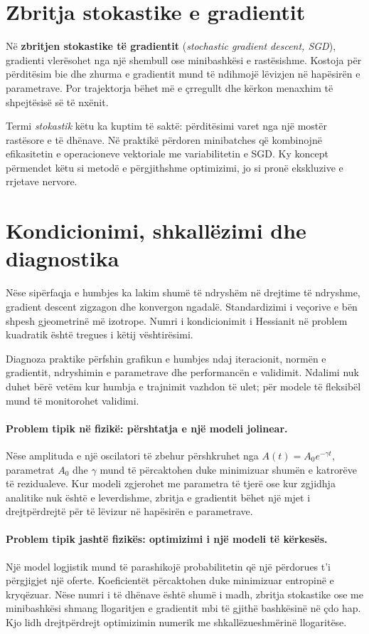 \documentclass[12pt,a4paper,oneside]{book}
\newcommand{\term}[2]{\textbf{#1} (\textit{#2})}
\begin{document}
\section{Zbritja stokastike e gradientit}

Në \term{zbritjen stokastike të gradientit}{stochastic gradient descent, SGD}, gradienti vlerësohet nga një shembull ose minibashkësi e rastësishme. Kostoja për përditësim bie dhe zhurma e gradientit mund të ndihmojë lëvizjen në hapësirën e parametrave. Por trajektorja bëhet më e çrregullt dhe kërkon menaxhim të shpejtësisë së të nxënit.

Termi \emph{stokastik} këtu ka kuptim të saktë: përditësimi varet nga një mostër rastësore e të dhënave. Në praktikë përdoren minibatches që kombinojnë efikasitetin e operacioneve vektoriale me variabilitetin e SGD. Ky koncept përmendet këtu si metodë e përgjithshme optimizimi, jo si pronë ekskluzive e rrjetave nervore.

\section{Kondicionimi, shkallëzimi dhe diagnostika}

Nëse sipërfaqja e humbjes ka lakim shumë të ndryshëm në drejtime të ndryshme, gradient descent zigzagon dhe konvergon ngadalë. Standardizimi i veçorive e bën shpesh gjeometrinë më izotrope. Numri i kondicionimit i Hessianit në problem kuadratik është tregues i këtij vështirësimi.

Diagnoza praktike përfshin grafikun e humbjes ndaj iteracionit, normën e gradientit, ndryshimin e parametrave dhe performancën e validimit. Ndalimi nuk duhet bërë vetëm kur humbja e trajnimit vazhdon të ulet; për modele të fleksibël mund të monitorohet validimi.


\paragraph{Problem tipik në fizikë: përshtatja e një modeli jolinear.}
Nëse amplituda e një oscilatori të zbehur përshkruhet nga $A(t)=A_0e^{-\gamma t}$, parametrat $A_0$ dhe $\gamma$ mund të përcaktohen duke minimizuar shumën e katrorëve të rezidualeve. Kur modeli zgjerohet me parametra të tjerë ose kur zgjidhja analitike nuk është e leverdishme, zbritja e gradientit bëhet një mjet i drejtpërdrejtë për të lëvizur në hapësirën e parametrave.

\paragraph{Problem tipik jashtë fizikës: optimizimi i një modeli të kërkesës.}
Një model logjistik mund të parashikojë probabilitetin që një përdorues t'i përgjigjet një oferte. Koeficientët përcaktohen duke minimizuar entropinë e kryqëzuar. Nëse numri i të dhënave është shumë i madh, zbritja stokastike ose me minibashkësi shmang llogaritjen e gradientit mbi të gjithë bashkësinë në çdo hap. Kjo lidh drejtpërdrejt optimizimin numerik me shkallëzueshmërinë llogaritëse.
\end{document}
